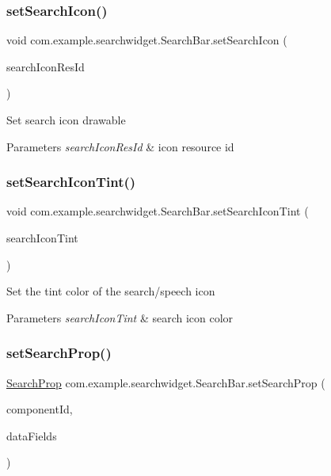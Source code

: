 \subsubsection{\texorpdfstring{setSearchIcon()}{setSearchIcon()}}
{\footnotesize\ttfamily void com.\+example.\+searchwidget.\+Search\+Bar.\+set\+Search\+Icon (\begin{DoxyParamCaption}\item[{int}]{search\+Icon\+Res\+Id }\end{DoxyParamCaption})}

Set search icon drawable


\begin{DoxyParams}{Parameters}
{\em search\+Icon\+Res\+Id} & icon resource id \\
\hline
\end{DoxyParams}
\mbox{\label{classcom_1_1example_1_1searchwidget_1_1_search_bar_adca3a2ec79965621b5d77a52ecc68c5b}} 
\subsubsection{\texorpdfstring{setSearchIconTint()}{setSearchIconTint()}}
{\footnotesize\ttfamily void com.\+example.\+searchwidget.\+Search\+Bar.\+set\+Search\+Icon\+Tint (\begin{DoxyParamCaption}\item[{int}]{search\+Icon\+Tint }\end{DoxyParamCaption})}

Set the tint color of the search/speech icon


\begin{DoxyParams}{Parameters}
{\em search\+Icon\+Tint} & search icon color \\
\hline
\end{DoxyParams}
\mbox{\label{classcom_1_1example_1_1searchwidget_1_1_search_bar_a4adb569b19b3f944775531927ab378cf}} 
\subsubsection{\texorpdfstring{setSearchProp()}{setSearchProp()}}
{\footnotesize\ttfamily \mbox{\hyperlink{classcom_1_1example_1_1searchwidget_1_1_builder_1_1_search_prop}{Search\+Prop}} com.\+example.\+searchwidget.\+Search\+Bar.\+set\+Search\+Prop (\begin{DoxyParamCaption}\item[{String}]{component\+Id,  }\item[{Array\+List$<$ String $>$}]{data\+Fields }\end{DoxyParamCaption})}

